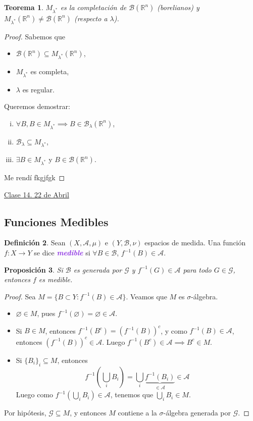 \documentclass{article}
\newtheorem{theorem}{Teorema}[subsection]
\newtheorem{proposition}[theorem]{Proposición}
\theoremstyle{definition}
\newtheorem{definition}[theorem]{Definición}
\theoremstyle{remark}
\numberwithin{equation}{section}
\newcommand{\A}{\mathcal{A}}
\newcommand{\B}{\mathcal{B}}
\newcommand{\R}{\mathbb{R}}
\newcommand{\lam}{\lambda}
\newcommand{\wea}[1]{\textcolor{BlueViolet}{\textbf{\emph{#1}}}}
\newcommand{\fecha}[1]{\begin{flushright} \underline{#1} \end{flushright}}
\begin{document}
\begin{theorem}
  $M_{\lam^*}$ es la completación de $\B(\R^n)$ (borelianos) y $M_{\lam^*}(\R^n) \neq \B(\R^n)$ (respecto a $\lam$).
\end{theorem}
\begin{proof}
  Sabemos que
  \begin{itemize}
    \item $\B(\R^n) \subseteq M_{\lam^*}(\R^n)$,
    \item $M_{\lam^*}$ es completa,
    \item $\lam$ es regular.
  \end{itemize}
  Queremos demostrar:
  \begin{enumerate}[(i)]
    \item $\forall B, B \in M_{\lam^*} \implies B \in \B_\lam(\R^n)$,
    \item $\B_\lam \subseteq M_{\lam^*}$,
    \item $\exists B \in M_{\lam^*}$ y $B \in \B(\R^n)$.
  \end{enumerate}
  Me rendí fkgjfgk
\end{proof}

\newpage
\fecha{Clase 14. 22 de Abril}
\subsection{Funciones Medibles}

\begin{definition}
  Sean $(X,\A,\mu)$ e $(Y,\B,\nu)$ espacios de medida. Una función $f \colon X \to Y$ se dice \wea{medible} si $\forall B \in \B$, $f^{-1}(B) \in \A$.
\end{definition}

\begin{proposition}
  Si $\B$ es generada por $\mathcal{G}$ y $f^{-1}(G) \in \A$ para todo $G \in \mathcal{G}$, entonces $f$ es medible.
\end{proposition}
\begin{proof}
  Sea $M = \{B \subset Y \colon f^{-1}(B) \in \A\}$. Veamos que $M$ es \( \sigma \)-álgebra.
  \begin{itemize}
    \item $\varnothing \in M$, pues $f^{-1}(\varnothing) = \varnothing \in \A$.
    \item Si $B \in M$, entonces \( f^{-1}(B^c) = (f^{-1}(B))^c \), y como $f^{-1}(B) \in \A$, entonces $(f^{-1}(B))^c \in \A$. Luego $f^{-1}(B^c) \in \A \implies B^c \in M$.
    \item Si $\{B_i\}_i \subseteq M$, entonces 
    \[ f^{-1}\left( \bigcup_i B_i  \right) = \bigcup_i \underbrace{f^{-1}(B_i )}_{\in \A} \in \A \]
    Luego como $f^{-1}\left( \bigcup_i B_i \right) \in \A$, tenemos que $\bigcup_i B_i \in M$.
  \end{itemize}
  Por hipótesis, $\mathcal{G } \subseteq M$, y entonces $M$ contiene a la \( \sigma \)-álgebra generada por \(\mathcal{G}\).
\end{proof}
\end{document}
